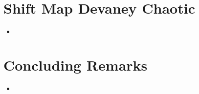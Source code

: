 \documentclass{article}
\begin{document}
    \section{Shift Map Devaney Chaotic}
    \begin{itemize}
        \item
    \end{itemize}

    \section{Concluding Remarks}
    \begin{itemize}
        \item
    \end{itemize}
\end{document}
